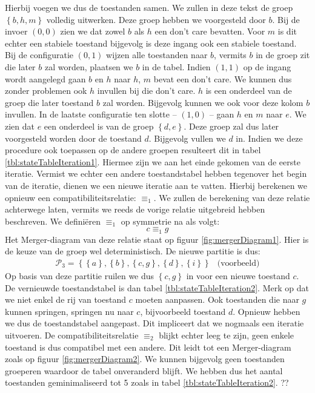 Hierbij voegen we dus de toestanden samen. We zullen in deze tekst de groep $\left\{b,h,m\right\}$ volledig uitwerken. Deze groep hebben we voorgesteld door $b$. Bij de invoer $\left(0,0\right)$ zien we dat zowel $b$ als $h$ een don't care bevatten. Voor $m$ is dit echter een stabiele toestand bijgevolg is deze ingang ook een stabiele toestand. Bij de configuratie $\left(0,1\right)$ wijzen alle toestanden naar $b$, vermits $b$ in de groep zit die later $b$ zal worden, plaatsen we $b$ in de tabel. Indien $\left(1,1\right)$ op de ingang wordt aangelegd gaan $b$ en $h$ naar $h$, $m$ bevat een don't care. We kunnen dus zonder problemen ook $h$ invullen bij die don't care. $h$ is een onderdeel van de groep die later toestand $b$ zal worden. Bijgevolg kunnen we ook voor deze kolom $b$ invullen. In de laatste configuratie ten slotte -- $\left(1,0\right)$ -- gaan $h$ en $m$ naar $e$. We zien dat $e$ een onderdeel is van de groep $\left\{d,e\right\}$. Deze groep zal dus later voorgesteld worden door de toestand $d$. Bijgevolg vullen we $d$ in. Indien we deze procedure ook toepassen op de andere groepen resulteert dit in tabel \ref{tbl:stateTableIteration1}. Hiermee zijn we aan het einde gekomen van de eerste iteratie. Vermist we echter een andere toestandstabel hebben tegenover het begin van de iteratie, dienen we een nieuwe iteratie aan te vatten. Hierbij berekenen we opnieuw een compatibiliteitsrelatie: $\equiv_1$. We zullen de berekening van deze relatie achterwege laten, vermits we reeds de vorige relatie uitgebreid hebben beschreven. We defini\"eren $\equiv_1$ op symmetrie na als volgt:
\begin{equation}
c\equiv_1g
\end{equation}
Het Merger-diagram van deze relatie staat op figuur \ref{fig:mergerDiagram1}. Hier is de keuze van de groep wel deterministisch. De nieuwe partitie is dus:
\begin{equation}
\begin{array}{lr}
\mathcal{P}_3=\left\{\left\{a\right\},\left\{b\right\},\left\{c,g\right\},\left\{d\right\},\left\{i\right\}\right\}&\mbox{(voorbeeld)}
\end{array}
\end{equation}
Op basis van deze partitie ruilen we dus $\left\{c,g\right\}$ in voor een nieuwe toestand $c$. De vernieuwde toestandstabel is dan tabel \ref{tbl:stateTableIteration2}. Merk op dat we niet enkel de rij van toestand $c$ moeten aanpassen. Ook toestanden die naar $g$ kunnen springen, springen nu naar $c$, bijvoorbeeld toestand $d$. Opnieuw hebben we dus de toestandstabel aangepast. Dit impliceert dat we nogmaals een iteratie uitvoeren. De compatibiliteitsrelatie $\equiv_2$ blijkt echter leeg te zijn, geen enkele toestand is dus compatibel met een andere. Dit leidt tot een Merger-diagram zoals op figuur \ref{fig:mergerDiagram2}. We kunnen bijgevolg geen toestanden groeperen waardoor de tabel onveranderd blijft. We hebben dus het aantal toestanden geminimaliseerd tot 5 zoals in tabel \ref{tbl:stateTableIteration2}.
??%
